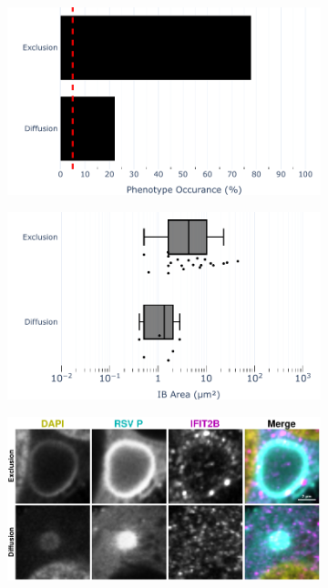 \begin{figure}
    \begin{subfigure}{0.5\textwidth}
        \caption{}
        \includegraphics[width=1\linewidth]{10. Chapter 5/Figs/01. Infection/02. IFIT2B/04. bar_i2b_a549-p.pdf} 
    \end{subfigure}
    \begin{subfigure}{0.5\textwidth}
        \caption{}
        \includegraphics[width=1\linewidth]{10. Chapter 5/Figs/01. Infection/02. IFIT2B/05. box_i2b_a549-p.pdf}
    \end{subfigure}
    \begin{subfigure}{1\textwidth}
        \caption{}
        \includegraphics[width=1\linewidth]{10. Chapter 5/Figs/01. Infection/02. IFIT2B/06. i2b a549 hrsv p.pdf} 

\end{subfigure}
\end{figure}
